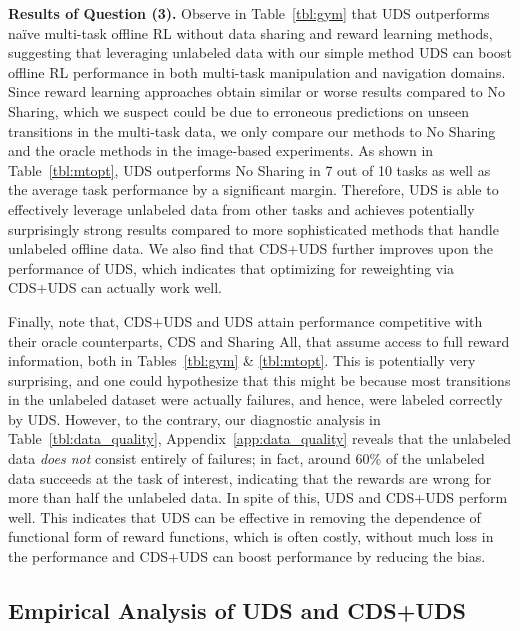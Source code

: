 \noindent \textbf{Results of Question (3).} Observe in Table~\ref{tbl:gym} that UDS outperforms na\"ive multi-task offline RL without data sharing and reward learning methods, suggesting that leveraging unlabeled data with our simple method UDS can boost offline RL performance in both multi-task manipulation and navigation domains.
Since reward learning approaches obtain similar or worse results compared to No Sharing, which we suspect could be due to erroneous predictions on unseen transitions in the multi-task data, we only compare our methods to No Sharing and the oracle methods in the image-based experiments. As shown in Table~\ref{tbl:mtopt}, UDS outperforms No Sharing in 7 out of 10 tasks as well as the average task performance by a significant margin. Therefore, UDS is able to effectively leverage unlabeled data from other tasks and achieves potentially surprisingly strong results compared to more sophisticated methods that handle unlabeled offline data. We also find that CDS+UDS further improves upon the performance of UDS, which indicates that optimizing for reweighting via CDS+UDS can actually work well.




Finally, note that, CDS+UDS and UDS attain performance competitive with their oracle counterparts, CDS and Sharing All, that assume access to full reward information, both in Tables~\ref{tbl:gym} \& \ref{tbl:mtopt}. This is potentially very surprising, and one could hypothesize that this might be because most transitions in the unlabeled dataset were actually failures, and hence, were labeled correctly by UDS. However, to the contrary, our diagnostic analysis in Table~\ref{tbl:data_quality}, Appendix~\ref{app:data_quality} reveals that the unlabeled data \emph{does not} consist entirely of failures; in fact, around 60\% of the unlabeled data succeeds at the task of interest, indicating that the rewards are wrong for more than half the unlabeled data. In spite of this, UDS and CDS+UDS perform well. This indicates that UDS can be effective in removing the dependence of functional form of reward functions, which is often costly, without much loss in the performance and CDS+UDS can boost performance by reducing the bias.

\vspace{-0.2cm}
\subsection{Empirical Analysis of UDS and CDS+UDS}
\label{sec:uds_empirical_analysis}
\vspace{-0.2cm}

